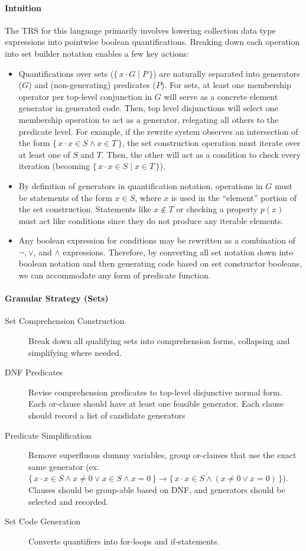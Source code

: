 \documentclass{article}
\newcommand{\bSet}[3]{%
  \{\, #1 \cdot #2 \mid #3 \, \}%
}
\newcommand{\bSetT}[2]{%
  \{\, #1 \cdot #2 \,\}%
}
\begin{document}
\paragraph{Intuition}
The TRS for this language primarily involves lowering collection data type expressions into pointwise boolean quantifications. Breaking down each operation into set builder notation enables a few key actions:
\begin{itemize}
  \item Quantifications over sets ($\bSet{x}{G}{P}$) are naturally separated into generators ($G$) and (non-generating) predicates ($P$). For sets, at least one membership operator per top-level conjunction in $G$ will serve as a concrete element generator in generated code. Then, top level disjunctions will select one membership operation to act as a generator, relegating all others to the predicate level. For example, if the rewrite system observes an intersection of the form $\bSetT{x}{x \in S \land x \in T}$, the set construction operation must iterate over at least one of $S$ and $T$. Then, the other will act as a condition to check every iteration (becoming $\bSet{x}{x \in S}{x \in T}$).
  \item By definition of generators in quantification notation, operations in $G$ must be statements of the form $x \in S$, where $x$ is used in the ``element'' portion of the set construction. Statements like $x \notin T$ or checking a property $p(x)$ must act like conditions since they do not produce any iterable elements.
  \item Any boolean expression for conditions may be rewritten as a combination of $\lnot, \lor$, and $\land$ expressions. Therefore, by converting all set notation down into boolean notation and then generating code based on set constructor booleans, we can accommodate any form of predicate function.
\end{itemize}


\paragraph{Granular Strategy (Sets)}
\begin{description}
  \item[Set Comprehension Construction] Break down all qualifying sets into comprehension forms, collapsing and simplifying where needed.
  \item[DNF Predicates] Revise comprehension predicates to top-level disjunctive normal form. Each or-clause should have at least one feasible generator. Each clause should record a list of candidate generators
  \item[Predicate Simplification] Remove superfluous dummy variables, group or-clauses that use the exact same generator (ex. $\bSetT{x}{x \in S \land x \neq 0 \lor x \in S \land x = 0} \rightarrow \bSetT{x}{x \in S \land (x \neq 0 \lor x = 0)}$). Clauses should be group-able based on DNF, and generators should be selected and recorded.
  \item[Set Code Generation] Converts quantifiers into for-loops and if-statements.
\end{description}
\end{document}
